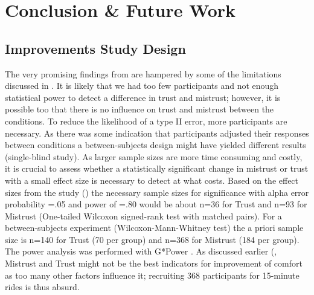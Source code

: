 \chapter{Conclusion \& Future Work}
\label{ch:conclusion}
\section{Improvements Study Design}
\label{ImproveStudy}
The very promising findings from  are hampered by some of the limitations discussed in . It is likely that we had too few participants and not enough statistical power to detect a difference in trust and mistrust; however, it is possible too that there is no influence on trust and mistrust between the conditions. To reduce the likelihood of a type II error, more participants are necessary. As there was some indication that participants adjusted their responses between conditions a between-subjects design might have yielded different results (single-blind study). 
As larger sample sizes are more time consuming and costly, it is crucial to assess whether a statistically significant change in mistrust or trust with a small effect size is necessary to detect at what costs.  Based on the effect sizes from the study () the necessary sample sizes for significance with alpha error probability =.05 and power of =.80 would be about n=36 for Trust and n=93 for Mistrust (One-tailed Wilcoxon signed-rank test with matched pairs). For a between-subjects experiment (Wilcoxon-Mann-Whitney test) the a priori sample size is n=140 for Trust (70 per group) and n=368 for Mistrust (184 per group). The power analysis was performed with G*Power \cite{Faul2007GPower:Sciences.}. As discussed earlier (,  Mistrust and Trust might not be the best indicators for improvement of comfort as too many other factors influence it; recruiting 368 participants for 15-minute rides is thus absurd. 

